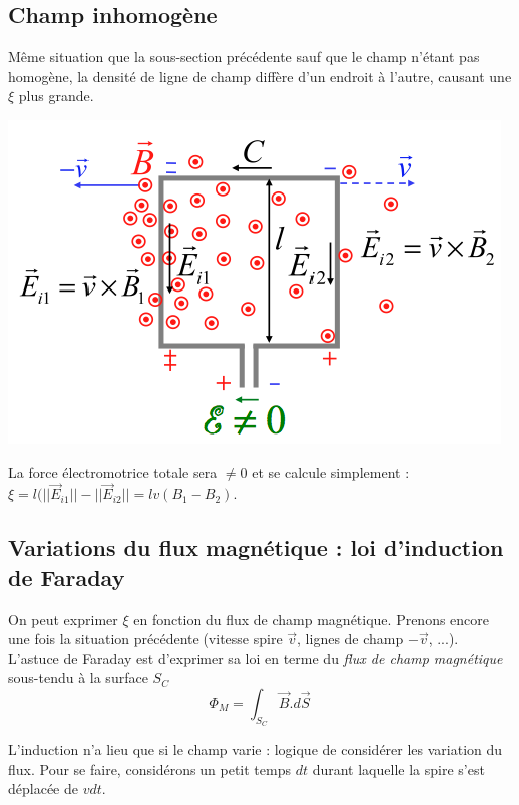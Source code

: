 \documentclass	[11pt, a4paper, openany]{book}
\begin{document}
\subsection{Champ inhomogène}
Même situation que la sous-section précédente sauf que le champ n'étant pas homogène, la densité de ligne de champ diffère d'un endroit à l'autre, causant une $\xi$ plus grande.
\begin{center}
	\includegraphics[scale=0.45]{em/image9.png}\\
\end{center}
La force électromotrice totale sera $\neq 0$ et se calcule simplement : $\xi = l(||\vec{E}_{i1}|| - ||\vec{E}_{i2}|| = lv(B_1 - B_2)$.\\

\subsection{Variations du flux magnétique : loi d'induction de Faraday}
On peut exprimer $\xi$ en fonction du flux de champ magnétique. Prenons encore une fois la situation précédente (vitesse spire $\vec{v}$, lignes de champ $-\vec{v}$, ...).\\
L'astuce de Faraday est d'exprimer sa loi en terme du \textit{flux de champ magnétique} sous-tendu à la surface $S_C$
\begin{equation}
	\Phi_M = \int_{S_C} \vec{B}.d\vec{S}
\end{equation}

L'induction n'a lieu que si le champ varie : logique de considérer les variation du flux. Pour se faire, considérons un petit temps $dt$ durant laquelle la spire s'est déplacée de $vdt$.
\end{document}
